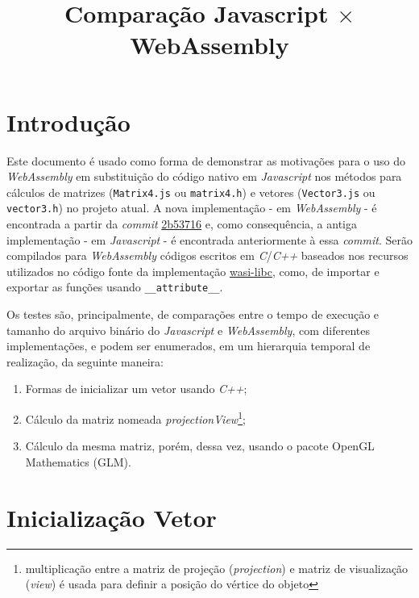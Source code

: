 \documentclass{article}
\title{Comparação Javascript \(\boldsymbol{\times}\) WebAssembly}
\begin{document}
\maketitle{}

\section*{Introdução}

Este documento é usado como forma de demonstrar as motivações para o uso do \textit{WebAssembly}\cite{wasi} em substituição do código nativo em \textit{Javascript} nos métodos para cálculos de matrizes (\verb|Matrix4.js| ou \verb|matrix4.h|) e vetores (\verb|Vector3.js| ou \verb|vector3.h|) no projeto atual. A nova implementação - em \textit{WebAssembly} - é encontrada a partir da \textit{commit} \href{https://github.com/guilhermeivo/guilhermeivo.github.io/commit/2b537169b3fdd6d0d027cc9d810aac9471eb477e}{2b53716} e, como consequência, a antiga implementação - em \textit{Javascript} - é encontrada anteriormente à essa \textit{commit}. Serão compilados para \textit{WebAssembly} códigos escritos em \textit{C}/\textit{C++} baseados nos recursos utilizados no código fonte da implementação \href{https://github.com/WebAssembly/wasi-libc}{wasi-libc}, como, de importar e exportar as funções usando \verb|__attribute__|.

Os testes são, principalmente, de comparações entre o tempo de execução e tamanho do arquivo binário do \textit{Javascript} e \textit{WebAssembly}, com diferentes implementações, e podem ser enumerados, em um hierarquia temporal de realização, da seguinte maneira:

{\renewcommand{\labelenumi}{(\alph{enumi})}
\begin{enumerate}
    \item Formas de inicializar um vetor usando \textit{C++};
    \item Cálculo da matriz nomeada \textit{projectionView}\footnote{multiplicação entre a matriz de projeção (\textit{projection}) e matriz de visualização (\textit{view}) é usada para definir a posição do vértice do objeto};
    \item Cálculo da mesma matriz, porém, dessa vez, usando o pacote OpenGL Mathematics (GLM)\cite{glm}.
\end{enumerate}}

\section*{Inicialização Vetor}
\end{document}
